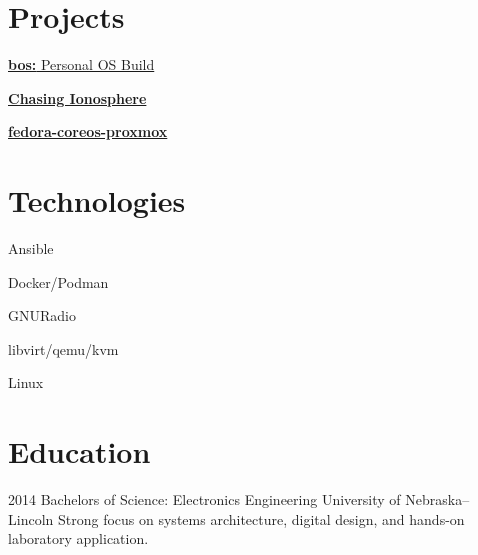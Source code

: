 \documentclass[]{src/friggeri-cv}
\begin{document}
\begin{aside}
  \section{Projects}
    \item[\rightarrow]\href{https://github.com/bpbeatty/bos}{\textbf{bos:} Personal OS Build}
    \item[\rightarrow]\href{https://www.northropgrumman.com/space/chasing-the-ionosphere}{\textbf{Chasing Ionosphere}}
    \item[\rightarrow]\href{https://github.com/bpbeatty/fedora-coreos-proxmox}{\textbf{fedora-coreos-proxmox}}
    ~
  \section{Technologies}
    \item[\rightarrow]{Ansible}
    \item[\rightarrow]{Docker/Podman}
    \item[\rightarrow]{GNURadio}
    \item[\rightarrow]{libvirt/qemu/kvm}
    \item[\rightarrow]{Linux}
    ~
\end{aside}

\section{Education}
\begin{entrylist}
  \entry
    {2014}
    {Bachelors of Science: Electronics Engineering}
    {University of Nebraska--Lincoln}
    {Strong focus on systems architecture, digital design, and hands-on laboratory application.}
\end{entrylist}
\end{document}

